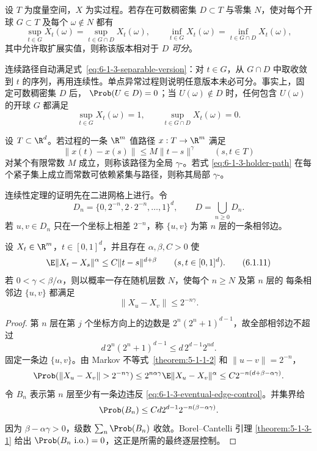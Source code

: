 \begin{definition}[可分版本]\label{def:6-1-3-3}
设 $T$ 为度量空间，$X$ 为实过程。若存在可数稠密集 $D\subset T$ 与零集 $N$，使对每个开球
$G\subset T$ 及每个 $\omega\notin N$ 都有
\[
 \sup_{t\in G}X_t(\omega)=\sup_{t\in G\cap D}X_t(\omega),
 \qquad
 \inf_{t\in G}X_t(\omega)=\inf_{t\in G\cap D}X_t(\omega),
 \tag{6.1.9}\label{eq:6-1-3-separable-version}
\]
其中允许取扩展实值，则称该版本相对于 $D$ \emph{可分}。
\end{definition}

连续路径自动满足式~\eqref{eq:6-1-3-separable-version}：对 $t\in G$，从 $G\cap D$ 中取收敛到
$t$ 的序列，再用连续性。单点异常过程则说明任意版本未必可分。事实上，固定可数稠密集 $D$ 后，
$\Prob(U\in D)=0$；当 $U(\omega)\notin D$ 时，任何包含 $U(\omega)$ 的开球 $G$ 都满足
\[
  \sup_{t\in G}X_t(\omega)=1,
  \qquad \sup_{t\in G\cap D}X_t(\omega)=0.
\]

\begin{definition}\label{def:6-1-3-2}
设 $T\subset\R^d$。若过程的一条 $\R^m$ 值路径 $x:T\to\R^m$ 满足
\[
  \|x(t)-x(s)\|\le M\|t-s\|^\gamma\qquad(s,t\in T)
  \tag{6.1.10}\label{eq:6-1-3-holder-path}
\]
对某个有限常数 $M$ 成立，则称该路径为全局 $\gamma$-\Holder{}。若式
\eqref{eq:6-1-3-holder-path} 在每个紧子集上成立而常数可依赖紧集与路径，则称其局部
$\gamma$-\Holder{}。
\end{definition}

连续性定理的证明先在二进网格上进行。令
\[
 D_n=\{0,2^{-n},2\cdot2^{-n},\ldots,1\}^d,
 \qquad D=\bigcup_{n\ge0}D_n.
\]
若 $u,v\in D_n$ 只在一个坐标上相差 $2^{-n}$，称 $\{u,v\}$ 为第 $n$ 层的一条相邻边。

\begin{lemma}[二进相邻边估计]\label{lemma:6-1-3-2}
设 $X_t\in\R^m$，$t\in[0,1]^d$，并且存在 $\alpha,\beta,C>0$ 使
\[
 \E\|X_t-X_s\|^\alpha\le C\|t-s\|^{d+\beta}
 \qquad(s,t\in[0,1]^d).
 \tag{6.1.11}\label{eq:6-1-3-moment-condition}
\]
若 $0<\gamma<\beta/\alpha$，则以概率一存在随机层数 $N$，使每个 $n\ge N$ 及第 $n$ 层的
每条相邻边 $\{u,v\}$ 都满足
\[
  \|X_u-X_v\|\le2^{-n\gamma}.
  \tag{6.1.12}\label{eq:6-1-3-eventual-edge-control}
\]
\end{lemma}

\begin{proof}
第 $n$ 层在第 $j$ 个坐标方向上的边数是
$2^n(2^n+1)^{d-1}$，故全部相邻边不超过
\[
 d\,2^n(2^n+1)^{d-1}\le d\,2^{d-1}2^{nd}.
\]
固定一条边 $\{u,v\}$。由 Markov 不等式~\ref{theorem:5-1-1-2} 和
$\|u-v\|=2^{-n}$，
\[
 \Prob(\|X_u-X_v\|>2^{-n\gamma})
 \le2^{n\alpha\gamma}\E\|X_u-X_v\|^\alpha
 \le C2^{-n(d+\beta-\alpha\gamma)}.
\]
令 $B_n$ 表示第 $n$ 层至少有一条边违反
\eqref{eq:6-1-3-eventual-edge-control}。并集界给
\[
 \Prob(B_n)
 \le Cd2^{d-1}2^{-n(\beta-\alpha\gamma)}.
\]
因为 $\beta-\alpha\gamma>0$，级数 $\sum_n\Prob(B_n)$ 收敛。Borel--Cantelli 引理
\ref{theorem:5-1-3-1} 给出 $\Prob(B_n\ \mathrm{i.o.})=0$，这正是所需的最终逐层控制。
\end{proof}

